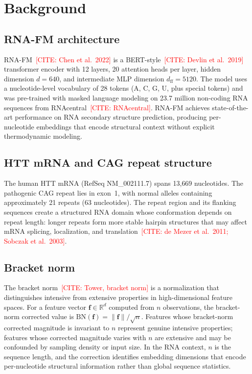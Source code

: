 \documentclass[11pt]{article}
\newcommand{\BN}{\mathrm{BN}}
\newcommand{\R}{\mathbb{R}}
\newcommand{\CITE}[1]{\textcolor{red}{[CITE: #1]}}
\begin{document}
\section{Background}
\label{sec:background}

\subsection{RNA-FM architecture}

RNA-FM~\CITE{Chen et al.~2022} is a BERT-style~\CITE{Devlin et al.~2019}
transformer encoder with 12 layers, 20 attention heads per layer,
hidden dimension $d = 640$, and intermediate MLP dimension $d_{\mathrm{ff}} = 5120$.
The model uses a nucleotide-level vocabulary of 28 tokens (A, C, G, U,
plus special tokens) and was pre-trained with masked language modeling
on 23.7 million non-coding RNA sequences from RNAcentral~\CITE{RNAcentral}.
%
RNA-FM achieves state-of-the-art performance on RNA secondary structure
prediction, producing per-nucleotide embeddings that encode structural
context without explicit thermodynamic modeling.

\subsection{HTT mRNA and CAG repeat structure}

The human HTT mRNA (RefSeq NM\_002111.7) spans 13{,}669 nucleotides.
The pathogenic CAG repeat lies in exon~1, with normal alleles containing
approximately 21 repeats (63 nucleotides). The repeat region and its
flanking sequences create a structured RNA domain whose conformation
depends on repeat length: longer repeats form more stable hairpin
structures that may affect mRNA splicing, localization, and
translation~\CITE{de Mezer et al.~2011; Sobczak et al.~2003}.

\subsection{Bracket norm}

The bracket norm~\CITE{Tower, bracket norm} is a normalization that
distinguishes intensive from extensive properties in high-dimensional
feature spaces. For a feature vector $\mathbf{f} \in \R^d$ computed
from $n$ observations, the bracket-norm corrected value is
$\BN(\mathbf{f}) = \|\mathbf{f}\| / \sqrt{n}$.
%
Features whose bracket-norm corrected magnitude is invariant to $n$
represent genuine intensive properties; features whose corrected
magnitude varies with $n$ are extensive and may be confounded by
sampling density or input size. In the RNA context, $n$ is the
sequence length, and the correction identifies embedding dimensions
that encode per-nucleotide structural information rather than
global sequence statistics.
\end{document}
